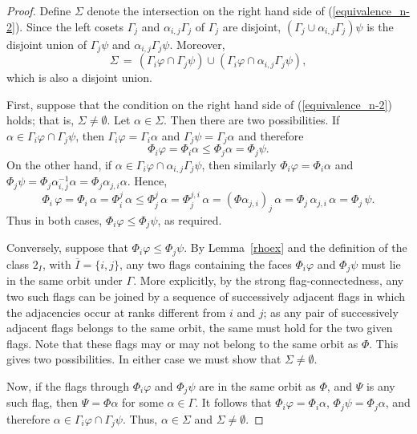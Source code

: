 \documentclass[12pt]{article}
\renewcommand{\phi}{\varphi}
\renewcommand{\bar}{\overline}
\renewcommand{\>}{\rangle}
\renewcommand{\leq}{\leqslant}
\theoremstyle{definition}\newtheorem{definition}{Definition}[section]
\begin{document}
\begin{proof} 
Define $\Sigma$ denote the intersection on the right hand side of (\ref{equivalence_n-2}).
Since the left cosets $\Gamma_j$ and $\alpha_{i,j}\Gamma_j$ of $\Gamma_j$ are disjoint, $(\Gamma_j \cup \alpha_{i,j}\Gamma_j )\psi$ is the disjoint union of $\Gamma_j\psi$ and $\alpha_{i,j}\Gamma_j\psi$. Moreover, 
\[\Sigma\,=\,(\Gamma_i\phi \cap \Gamma_j\psi) \cup (\Gamma_i\varphi \cap \alpha_{i,j}\Gamma_j \psi),\] 
which is also a disjoint union.

First, suppose that the condition on the right hand side of (\ref{equivalence_n-2}) holds;  that is, $\Sigma\neq\emptyset$. Let $\alpha \in \Sigma$. Then there are two possibilities. If $\alpha\in\Gamma_i\phi\cap\Gamma_j\psi$, then $\Gamma_{i}\phi=\Gamma_{i}\alpha$ and $\Gamma_{j}\psi=\Gamma_{j}\alpha$ and therefore
\[\Phi_i\phi =\Phi_{i}\alpha \leq \Phi_{j}\alpha=\Phi_j\psi.\] 
On the other hand, if  $\alpha \in \Gamma_i\phi\cap\alpha_{i,j}\Gamma_j  \psi$, then similarly $\Phi_i \phi = \Phi_i \alpha$ and $\Phi_{j}\psi =  \Phi_{j}\alpha_{i,j}^{-1}\alpha = \Phi_{j}\alpha_{j,i}\alpha$. Hence,
\[\Phi_i\,\phi = \Phi_i\, \alpha = \Phi_i^j \, \alpha \leq\Phi^j_j \,\alpha = \Phi^{j,i}_j \,\alpha = (\Phi \alpha_{j,i})_j\, \alpha = \Phi_j\, \alpha_{j,i} \,\alpha = \Phi_j \,\psi .\]
Thus in both cases, $\Phi_i\phi \leq \Phi_j\psi$, as required.

Conversely, suppose that $\Phi_i\phi \leq\Phi_j\psi$. By Lemma~\ref{rhoex} and the definition of the class $2_I$, with $\bar{I} = \{i,j\}$, any two flags containing the faces $\Phi_i\phi$ and $\Phi_j\psi$ must lie in the same orbit under $\Gamma$. More explicitly, by the strong flag-connectedness, any two such flags can be joined by a sequence of successively adjacent flags in which the adjacencies occur at ranks different from $i$ and $j$; as any pair of successively adjacent flags belongs  to the same orbit, the same must hold for the two given flags. Note that these flags may or may not belong to the same orbit as $\Phi$. This gives two possibilities. In either case we must show that $\Sigma\neq\emptyset$. 

Now, if the flags through $\Phi_i\phi$ and $\Phi_j\psi$ are in the same orbit as $\Phi$, and $\Psi$ is any such flag, then $\Psi=\Phi\alpha$ for some $\alpha \in \Gamma$. It follows that $\Phi_i\phi =  \Phi_i\alpha$, $\Phi_j\psi=\Phi_j\alpha$, and therefore $\alpha \in \Gamma_i\phi \cap \Gamma_j \psi$. Thus, $\alpha\in\Sigma$ and $\Sigma\neq \emptyset$.


\end{proof}
\end{document}
